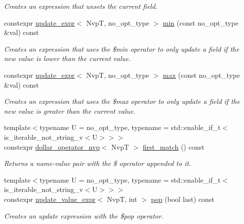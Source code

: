\begin{DoxyCompactItemize}
\begin{DoxyCompactList}\small\item\em Creates an expression that unsets the current field. \end{DoxyCompactList}\item 
constexpr \hyperlink{classmongo__odm_1_1update__expr}{update\+\_\+expr}$<$ NvpT, no\+\_\+opt\+\_\+type $>$ \hyperlink{classmongo__odm_1_1nvp__base_a93c7d2948059425ffb7122504bb39379}{min} (const no\+\_\+opt\+\_\+type \&val) const 
\begin{DoxyCompactList}\small\item\em Creates an expression that uses the \$min operator to only update a field if the new value is lower than the current value. \end{DoxyCompactList}\item 
constexpr \hyperlink{classmongo__odm_1_1update__expr}{update\+\_\+expr}$<$ NvpT, no\+\_\+opt\+\_\+type $>$ \hyperlink{classmongo__odm_1_1nvp__base_a9b66983c69573197417350034f94eebc}{max} (const no\+\_\+opt\+\_\+type \&val) const 
\begin{DoxyCompactList}\small\item\em Creates an expression that uses the \$max operator to only update a field if the new value is greater than the current value. \end{DoxyCompactList}\item 
{\footnotesize template$<$typename U  = no\+\_\+opt\+\_\+type, typename  = std\+::enable\+\_\+if\+\_\+t$<$is\+\_\+iterable\+\_\+not\+\_\+string\+\_\+v$<$\+U$>$$>$$>$ }\\constexpr \hyperlink{classmongo__odm_1_1dollar__operator__nvp}{dollar\+\_\+operator\+\_\+nvp}$<$ NvpT $>$ \hyperlink{classmongo__odm_1_1nvp__base_a9d1b3cff13f56eed1e8e08f011668f7d}{first\+\_\+match} () const 
\begin{DoxyCompactList}\small\item\em Returns a name-\/value pair with the \$ operator appended to it. \end{DoxyCompactList}\item 
{\footnotesize template$<$typename U  = no\+\_\+opt\+\_\+type, typename  = std\+::enable\+\_\+if\+\_\+t$<$is\+\_\+iterable\+\_\+not\+\_\+string\+\_\+v$<$\+U$>$$>$$>$ }\\constexpr \hyperlink{classmongo__odm_1_1update__value__expr}{update\+\_\+value\+\_\+expr}$<$ NvpT, int $>$ \hyperlink{classmongo__odm_1_1nvp__base_afe7ac6d378952499bc9c9ee6e584059f}{pop} (bool last) const 
\begin{DoxyCompactList}\small\item\em Creates an update expression with the \$pop operator. \end{DoxyCompactList}\item 

\end{DoxyCompactItemize}
